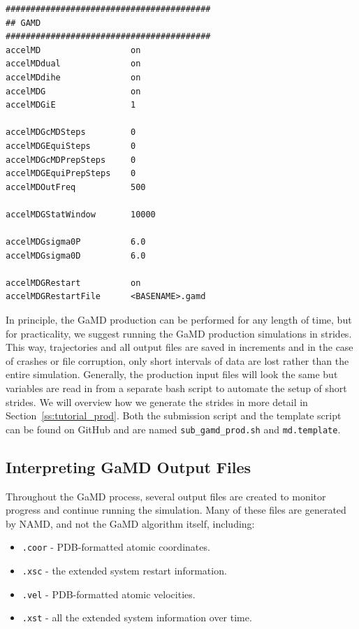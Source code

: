 \documentclass[9pt,tutorial]{livecoms}
\begin{document}
\begin{lstlisting}[label=gamd_prod,caption=md.*.in, basicstyle=\small,backgroundcolor=\color{light-gray}]
#########################################
## GAMD                    
#########################################
accelMD                  on             
accelMDdual              on
accelMDdihe              on
accelMDG                 on        
accelMDGiE               1             
         
accelMDGcMDSteps         0        
accelMDGEquiSteps        0     
accelMDGcMDPrepSteps     0         
accelMDGEquiPrepSteps    0         
accelMDOutFreq           500

accelMDGStatWindow       10000

accelMDGsigma0P          6.0            
accelMDGsigma0D          6.0 

accelMDGRestart          on 
accelMDGRestartFile      <BASENAME>.gamd  

\end{lstlisting}

In principle, the GaMD production can be performed for any length of time, but for practicality, we suggest running the GaMD production simulations in strides. This way, trajectories and all output files are saved in increments and in the case of crashes or file corruption, only short intervals of data are lost rather than the entire simulation. Generally, the production input files will look the same but variables are read in from a separate bash script to automate the setup of short strides. We will overview how we generate the strides in more detail in Section~\ref{ss:tutorial_prod}. Both the submission script and the template script can be found on GitHub and are named \texttt{sub\_gamd\_prod.sh} and \texttt{md.template}.

\subsection{Interpreting GaMD Output Files}
\label{ss:interpret_output}
Throughout the GaMD process, several output files are created to monitor progress and continue running the simulation. Many of these files are generated by NAMD, and not the GaMD algorithm itself, including:

\begin{itemize}
    \item \texttt{.coor} - PDB-formatted atomic coordinates.
    \item \texttt{.xsc} - the extended system restart information.
    \item \texttt{.vel} - PDB-formatted atomic velocities.
    \item \texttt{.xst} - all the extended system information over time. 
    
\end{itemize}
\end{document}
